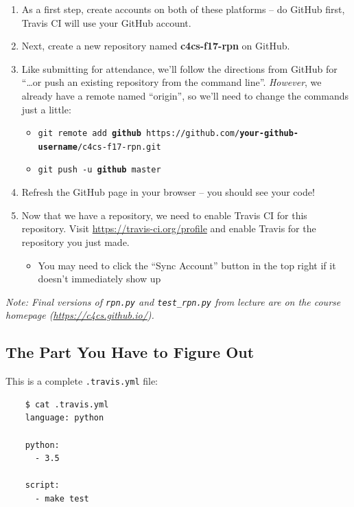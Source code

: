 \documentclass{article}
\begin{document}
\begin{enumerate}
  \item As a first step, create accounts on both of these platforms -- do
    GitHub first, Travis CI will use your GitHub account.
  \item Next, create a new repository named \textbf{c4cs-f17-rpn} on GitHub.
  \item Like submitting for attendance, we'll follow the directions from
    GitHub for ``\dots{}or push an existing repository from the command
    line''. \emph{However}, we already have a remote named ``origin'', so
    we'll need to change the commands just a little:
    \begin{itemize}
      \item \texttt{git remote add \textbf{github} https://github.com/\textbf{your-github-username}/c4cs-f17-rpn.git}
      \item \texttt{git push -u \textbf{github} master}
    \end{itemize}
  \item Refresh the GitHub page in your browser -- you should see your code!
  \item Now that we have a repository, we need to enable Travis CI for this
    repository. Visit \url{https://travis-ci.org/profile} and enable Travis
    for the repository you just made.
    \begin{itemize}
      \item You may need to click the ``Sync Account'' button in the top
        right if it doesn't immediately show up
    \end{itemize}
\end{enumerate}

\emph{Note: Final versions of \texttt{rpn.py} and \texttt{test\_rpn.py} from
  lecture are on the course homepage (\url{https://c4cs.github.io/}).}

\newpage

\subsection{The Part You Have to Figure Out}

{\color{violet}
  This is a complete \texttt{.travis.yml} file:

  \begin{lstlisting}
    $ cat .travis.yml
    language: python

    python:
      - 3.5

    script:
      - make test
  \end{lstlisting}
}
\end{document}
